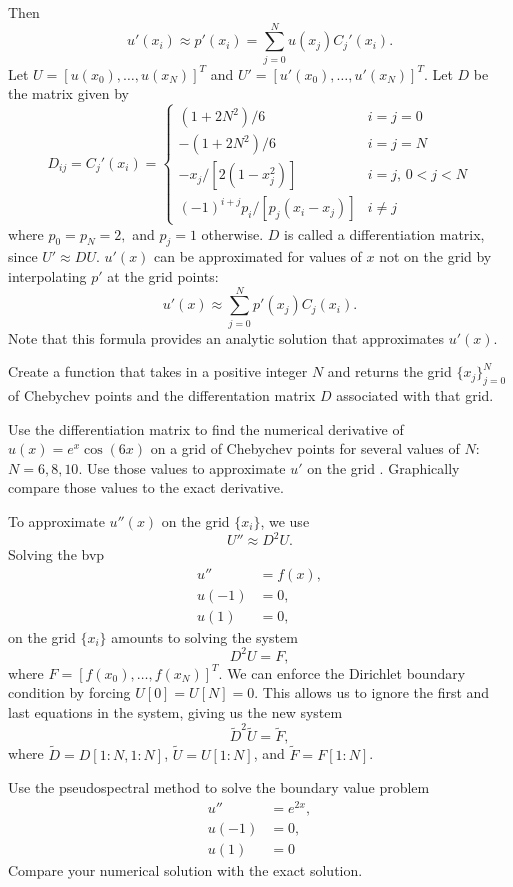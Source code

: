 Then 
\[
u'(x_i) \approx p'(x_i) = \sum_{j=0}^N u(x_j)C_j'(x_i). 
\]
Let $U = [u(x_0),\ldots, u(x_N)]^T$ and $U' = [u'(x_0),\ldots, u'(x_N)]^T$.
Let $D$ be the matrix given by
\begin{equation*}
D_{ij} = C_j'(x_i) = \begin{cases} (1+2N^2)/6 & i=j=0 \\ -(1+2N^2)/6 & i=j=N \\
-x_j/[2(1-x_j^2)] & i=j, \, 0<j<N \\ 
(-1)^{i+j}p_i/[p_j(x_i-x_j)] & i \not = j
   \end{cases}
\end{equation*}
where $p_0 = p_N = 2,$ and $p_j = 1$ otherwise. $D$ is called a differentiation matrix, since $U' \approx DU$.
$u'(x)$ can be approximated for values of $x$ not on the grid by interpolating $p'$ at the grid points: 
\[
u'(x) \approx \sum_{j=0}^N p'(x_j)C_j(x_i). 
\]
Note that this formula provides an analytic solution that approximates $u'(x)$.

\begin{problem}
	Create a function  that takes in a positive integer $N$ and returns the grid $\{x_j\}_{j=0}^N$ of Chebychev points and the differentation matrix $D$ associated with that grid. 
	
	Use the differentiation matrix to find the numerical derivative of $u(x) = e^{x}\cos(6x)$ on a grid of Chebychev points for several values of $N:$ $N=6, 8, 10.$
	 Use those values to approximate $u'$ on the grid . Graphically compare those values to the exact derivative. 
\end{problem}


To approximate $u''(x)$ on the grid $\{x_i\}$, we use 
\[U'' \approx D^2 U.
\]
Solving the bvp
\begin{align*}
u'' &= f(x), \\
u(-1) &= 0, \\
u(1) &= 0,
\end{align*}
on the grid $\{x_i\}$ amounts to solving the system 
\[D^2 U = F,\]
where $F = [f(x_0),\ldots, f(x_N)]^T$. We can enforce the Dirichlet boundary condition by forcing $U[0] = U[N] = 0$. This allows us to ignore the first and last equations in the system, giving us the new system 
\[\tilde{D}^2 \tilde{U} = \tilde{F},\]
where $\tilde{D} = D[1:N,1:N]$, $\tilde{U} = U[1:N]$, and $\tilde{F} = F[1:N]$.

\begin{problem}
	Use the pseudospectral method to solve the boundary value problem 
	\begin{align*}
	u'' &= e^{2x}, \\
	u(-1) &= 0, \\
	u(1) &= 0
	\end{align*}
	Compare your numerical solution with the exact solution.
\end{problem}


